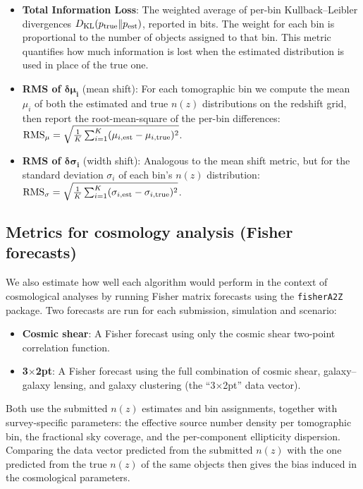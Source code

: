 \documentclass[11pt,twoside,letterpaper,onecolumn,english]{article}
\begin{document}
\begin{itemize}
    \item \textbf{Total Information Loss}: The weighted average of
      per-bin Kullback--Leibler divergences $D_{\rm KL}(p_{\rm true}
      \| p_{\rm est})$, reported in bits. The weight for each bin is
      proportional to the number of objects assigned to that bin.  This
      metric quantifies how much information is lost when the estimated
      distribution is used in place of the true one.

    \item \textbf{RMS of $\boldsymbol{\delta\mu_i}$} (mean shift):
      For each tomographic bin we compute the mean $\mu_i$ of both the
      estimated and true $n(z)$ distributions on the redshift grid, then
      report the root-mean-square of the per-bin differences:
      ${\rm RMS}_\mu = \sqrt{\frac{1}{K}\sum_{i=1}^{K}(\mu_{i,{\rm est}} - \mu_{i,{\rm true}})^2}$.

    \item \textbf{RMS of $\boldsymbol{\delta\sigma_i}$} (width shift):
      Analogous to the mean shift metric, but for the standard deviation
      $\sigma_i$ of each bin's $n(z)$ distribution:
      ${\rm RMS}_\sigma = \sqrt{\frac{1}{K}\sum_{i=1}^{K}(\sigma_{i,{\rm est}} - \sigma_{i,{\rm true}})^2}$.
\end{itemize}


\subsection{\texorpdfstring{Metrics for cosmology analysis (Fisher forecasts)}{Metrics for cosmology analysis (Fisher forecasts)}}

We also estimate how well each algorithm would perform in the context
of cosmological analyses by running Fisher matrix forecasts using the
\texttt{fisherA2Z} package.  Two forecasts are run for each submission,
simulation and scenario:

\begin{itemize}
    \item \textbf{Cosmic shear}: A Fisher forecast using only the
      cosmic shear two-point correlation function.
    \item \textbf{3$\times$2pt}: A Fisher forecast using the full
      combination of cosmic shear, galaxy--galaxy lensing, and galaxy
      clustering (the ``3$\times$2pt'' data vector).
\end{itemize}

Both use the submitted $n(z)$ estimates and bin assignments, together
with survey-specific parameters: the effective source number density
per tomographic bin, the fractional sky coverage, and the
per-component ellipticity dispersion.  Comparing the data vector
predicted from the submitted $n(z)$ with the one predicted from the
true $n(z)$ of the same objects then gives the bias induced in the
cosmological parameters.
\end{document}
